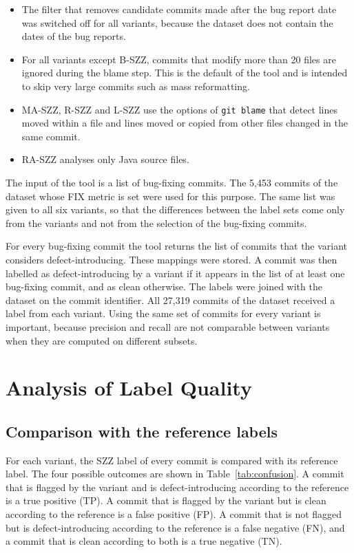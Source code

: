 \documentclass[12pt,a4paper,oneside]{report}
\begin{document}
\begin{itemize}[leftmargin=*]
\item The filter that removes candidate commits made after the bug report
date was switched off for all variants, because the dataset does not contain
the dates of the bug reports.
\item For all variants except B-SZZ, commits that modify more than 20 files
are ignored during the blame step. This is the default of the tool and is
intended to skip very large commits such as mass reformatting.
\item MA-SZZ, R-SZZ and L-SZZ use the options of \texttt{git blame} that
detect lines moved within a file and lines moved or copied from other files
changed in the same commit.
\item RA-SZZ analyses only Java source files.
\end{itemize}

The input of the tool is a list of bug-fixing commits. The 5,453 commits of
the dataset whose FIX metric is set were used for this purpose. The same list
was given to all six variants, so that the differences between the label sets
come only from the variants and not from the selection of the bug-fixing
commits.

For every bug-fixing commit the tool returns the list of commits that the
variant considers defect-introducing. These mappings were stored. A commit
was then labelled as defect-introducing by a variant if it appears in the
list of at least one bug-fixing commit, and as clean otherwise. The labels
were joined with the dataset on the commit identifier. All 27,319 commits of
the dataset received a label from each variant. Using the same set of commits
for every variant is important, because precision and recall are not
comparable between variants when they are computed on different subsets.

\section{Analysis of Label Quality}\label{sec:quality-method}

\subsection{Comparison with the reference labels}

For each variant, the SZZ label of every commit is compared with its
reference label. The four possible outcomes are shown in
Table~\ref{tab:confusion}. A commit that is flagged by the variant and is
defect-introducing according to the reference is a true positive (TP). A
commit that is flagged by the variant but is clean according to the reference
is a false positive (FP). A commit that is not flagged but is
defect-introducing according to the reference is a false negative (FN), and a
commit that is clean according to both is a true negative (TN).
\end{document}
